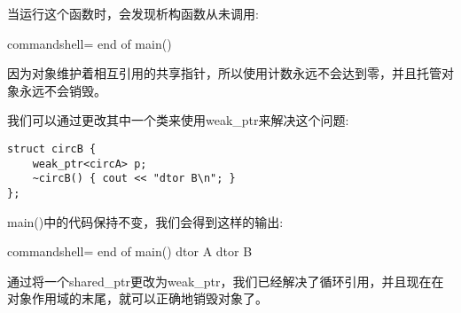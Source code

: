当运行这个函数时，会发现析构函数从未调用:

\begin{tcblisting}{commandshell={}}
end of main()
\end{tcblisting}

因为对象维护着相互引用的共享指针，所以使用计数永远不会达到零，并且托管对象永远不会销毁。

我们可以通过更改其中一个类来使用weak\_ptr来解决这个问题:

\begin{lstlisting}[style=styleCXX]
struct circB {
	weak_ptr<circA> p;
	~circB() { cout << "dtor B\n"; }
};
\end{lstlisting}

main()中的代码保持不变，我们会得到这样的输出:

\begin{tcblisting}{commandshell={}}
end of main()
dtor A
dtor B
\end{tcblisting}

通过将一个shared\_ptr更改为weak\_ptr，我们已经解决了循环引用，并且现在在对象作用域的末尾，就可以正确地销毁对象了。








